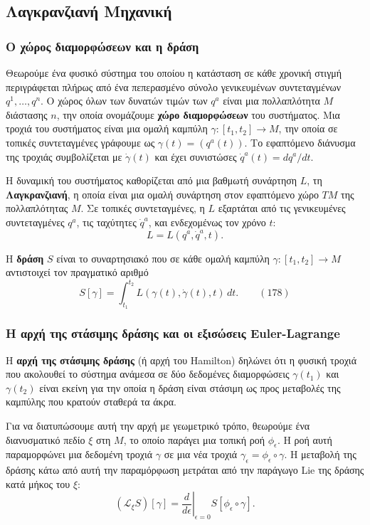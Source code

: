 \documentclass[12pt]{article}
\begin{document}
\subsection{Λαγκρανζιανή Μηχανική}

\subsubsection{Ο χώρος διαμορφώσεων και η δράση}

Θεωρούμε ένα φυσικό σύστημα του οποίου η κατάσταση σε κάθε χρονική στιγμή περιγράφεται πλήρως από ένα πεπερασμένο σύνολο γενικευμένων συντεταγμένων $q^1, \dots, q^n$. Ο χώρος όλων των δυνατών τιμών των $q^a$ είναι μια πολλαπλότητα $M$ διάστασης $n$, την οποία ονομάζουμε \textbf{χώρο διαμορφώσεων} του συστήματος. Μια τροχιά του συστήματος είναι μια ομαλή καμπύλη $\gamma: [t_1, t_2] \to M$, την οποία σε τοπικές συντεταγμένες γράφουμε ως $\gamma(t) = (q^a(t))$. Το εφαπτόμενο διάνυσμα της τροχιάς συμβολίζεται με $\dot{\gamma}(t)$ και έχει συνιστώσες $\dot{q}^a(t) = dq^a/dt$.

Η δυναμική του συστήματος καθορίζεται από μια βαθμωτή συνάρτηση $L$, τη \textbf{Λαγκρανζιανή}, η οποία είναι μια ομαλή συνάρτηση στον εφαπτόμενο χώρο $TM$ της πολλαπλότητας $M$. Σε τοπικές συντεταγμένες, η $L$ εξαρτάται από τις γενικευμένες συντεταγμένες $q^a$, τις ταχύτητες $\dot{q}^a$, και ενδεχομένως τον χρόνο $t$:
\[
L = L(q^a, \dot{q}^a, t).
\]

Η \textbf{δράση} $S$ είναι το συναρτησιακό που σε κάθε ομαλή καμπύλη $\gamma: [t_1, t_2] \to M$ αντιστοιχεί τον πραγματικό αριθμό
\begin{equation}
S[\gamma] = \int_{t_1}^{t_2} L(\gamma(t), \dot{\gamma}(t), t) \, dt. \qquad (178)
\end{equation}

\subsubsection{Η αρχή της στάσιμης δράσης και οι εξισώσεις Euler-Lagrange}

Η \textbf{αρχή της στάσιμης δράσης} (ή αρχή του Hamilton) δηλώνει ότι η φυσική τροχιά που ακολουθεί το σύστημα ανάμεσα σε δύο δεδομένες διαμορφώσεις $\gamma(t_1)$ και $\gamma(t_2)$ είναι εκείνη για την οποία η δράση είναι στάσιμη ως προς μεταβολές της καμπύλης που κρατούν σταθερά τα άκρα.

Για να διατυπώσουμε αυτή την αρχή με γεωμετρικό τρόπο, θεωρούμε ένα διανυσματικό πεδίο $\xi$ στη $M$, το οποίο παράγει μια τοπική ροή $\phi_\epsilon$. Η ροή αυτή παραμορφώνει μια δεδομένη τροχιά $\gamma$ σε μια νέα τροχιά $\gamma_\epsilon = \phi_\epsilon \circ \gamma$. Η μεταβολή της δράσης κάτω από αυτή την παραμόρφωση μετράται από την παράγωγο Lie της δράσης κατά μήκος του $\xi$:
\[
(\mathcal{L}_\xi S)[\gamma] = \left. \frac{d}{d\epsilon} \right|_{\epsilon=0} S[\phi_\epsilon \circ \gamma].
\]
\end{document}

